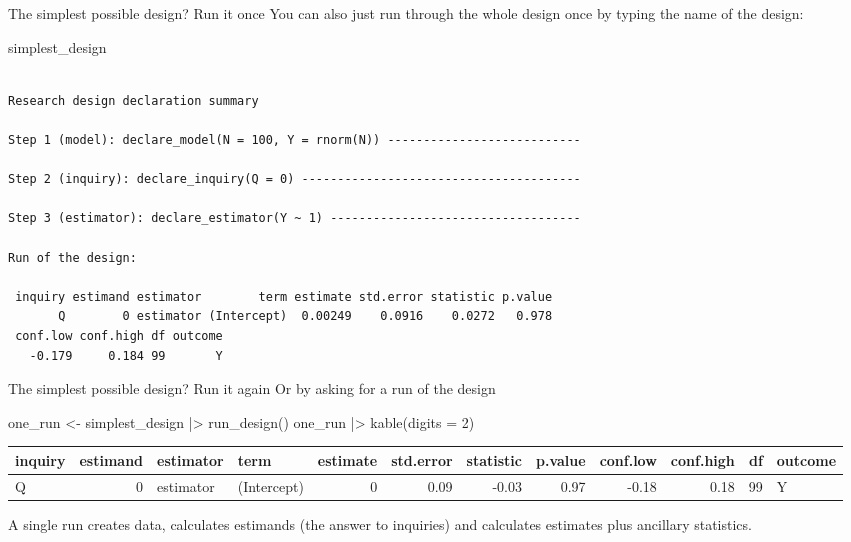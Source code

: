 \documentclass[
  11pt,
  ignorenonframetext,
]{beamer}
\newenvironment{Shaded}{\begin{snugshade}}{\end{snugshade}}
\newcommand{\AttributeTok}[1]{\textcolor[rgb]{0.40,0.45,0.13}{#1}}
\newcommand{\DecValTok}[1]{\textcolor[rgb]{0.68,0.00,0.00}{#1}}
\newcommand{\FunctionTok}[1]{\textcolor[rgb]{0.28,0.35,0.67}{#1}}
\newcommand{\NormalTok}[1]{\textcolor[rgb]{0.00,0.23,0.31}{#1}}
\newcommand{\OtherTok}[1]{\textcolor[rgb]{0.00,0.23,0.31}{#1}}
\newcommand{\SpecialCharTok}[1]{\textcolor[rgb]{0.37,0.37,0.37}{#1}}
\begin{document}
\begin{frame}[fragile]{The simplest possible design? Run it once}
\protect\hypertarget{the-simplest-possible-design-run-it-once}{}
You can also just run through the whole design once by typing the name
of the design:

\begin{Shaded}
\begin{Highlighting}[]
\NormalTok{simplest\_design}
\end{Highlighting}
\end{Shaded}

\begin{verbatim}

Research design declaration summary

Step 1 (model): declare_model(N = 100, Y = rnorm(N)) ---------------------------

Step 2 (inquiry): declare_inquiry(Q = 0) ---------------------------------------

Step 3 (estimator): declare_estimator(Y ~ 1) -----------------------------------

Run of the design:

 inquiry estimand estimator        term estimate std.error statistic p.value
       Q        0 estimator (Intercept)  0.00249    0.0916    0.0272   0.978
 conf.low conf.high df outcome
   -0.179     0.184 99       Y
\end{verbatim}
\end{frame}

\begin{frame}[fragile]{The simplest possible design? Run it again}
\protect\hypertarget{the-simplest-possible-design-run-it-again}{}
Or by asking for a run of the design

\begin{Shaded}
\begin{Highlighting}[]
\NormalTok{one\_run }\OtherTok{\textless{}{-}}\NormalTok{ simplest\_design }\SpecialCharTok{|\textgreater{}} \FunctionTok{run\_design}\NormalTok{()}
\NormalTok{one\_run }\SpecialCharTok{|\textgreater{}} \FunctionTok{kable}\NormalTok{(}\AttributeTok{digits =} \DecValTok{2}\NormalTok{)}
\end{Highlighting}
\end{Shaded}

\begin{tabular}{l|r|l|l|r|r|r|r|r|r|r|l}
\hline
inquiry & estimand & estimator & term & estimate & std.error & statistic & p.value & conf.low & conf.high & df & outcome\\
\hline
Q & 0 & estimator & (Intercept) & 0 & 0.09 & -0.03 & 0.97 & -0.18 & 0.18 & 99 & Y\\
\hline
\end{tabular}

A single run creates data, calculates estimands (the answer to
inquiries) and calculates estimates plus ancillary statistics.
\end{frame}
\end{document}

